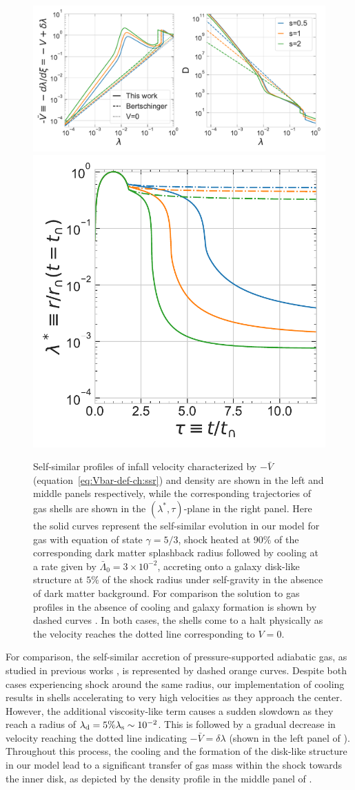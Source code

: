 \begin{figure}[htbp]
\centering
\includegraphics[width=0.665\linewidth]{plots/Eds-gaso_profiles_shocked_vary-s.pdf}
\includegraphics[width=0.325\linewidth]{plots/Eds-gaso_trajectory_shocked_vary-s.pdf}
\caption{%
Self-similar profiles of infall velocity characterized by $-\bar{V}$ (equation~\ref{eq:Vbar-def-ch:ssr}) and density are shown in the left and middle panels respectively, while the corresponding trajectories of gas shells are shown in the $(\lambda^*,\tau)$-plane in the right panel. Here the solid curves represent the self-similar evolution in our model for gas with equation of state $\gamma=5/3$, shock heated at 90\% of the corresponding dark matter splashback radius followed by cooling at a rate given by $\bar{\Lambda}_0=3 \times 10^{-2}$, accreting onto a galaxy disk-like structure at $5\%$ of the shock radius under self-gravity in the absence of dark matter background. For comparison the solution to gas profiles in the absence of cooling and galaxy formation is shown by dashed curves \cite{1985Bertschinger}. 
In both cases, the shells come to a halt physically as the velocity reaches the dotted line corresponding to $V=0$.}
\label{fig:gaso-vary-s-ch:ssr}
\end{figure}

For comparison, the self-similar accretion of pressure-supported adiabatic gas, as studied in previous works \cite{1984FillmoreGoldreich,1985Bertschinger,2016ShiICM}, is represented by dashed orange curves. Despite both cases experiencing shock around the same radius, our implementation of cooling results in shells accelerating to very high velocities as they approach the center. However, the additional viscosity-like term causes a sudden slowdown as they reach a radius of $\lambda_{\rm d}=5\% \lambda_{\rm s} \sim 10^{-2}$. This is followed by a gradual decrease in velocity reaching the dotted line indicating $-\bar{V}=\delta \lambda$ (shown in the left panel of ). 
Throughout this process, the cooling and the formation of the disk-like structure in our model lead to a significant transfer of gas mass within the shock towards the inner disk, as depicted by the density profile in the middle panel of .

